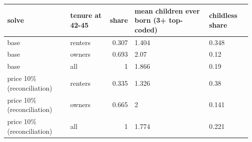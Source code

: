 \begingroup\small
\setlength{\tabcolsep}{3pt}
\renewcommand{\arraystretch}{1.04}
\begin{tabularx}{\linewidth}{XXrXX}
\toprule
solve & tenure at 42-45 & share & mean children ever born (3+ top-coded) & childless share \\
\midrule
base & renters & 0.307 & 1.404 & 0.348 \\
base & owners & 0.693 & 2.07 & 0.12 \\
base & all & 1 & 1.866 & 0.19 \\
price 10\% (reconciliation) & renters & 0.335 & 1.326 & 0.38 \\
price 10\% (reconciliation) & owners & 0.665 & 2 & 0.141 \\
price 10\% (reconciliation) & all & 1 & 1.774 & 0.221 \\
\bottomrule
\end{tabularx}
\endgroup
